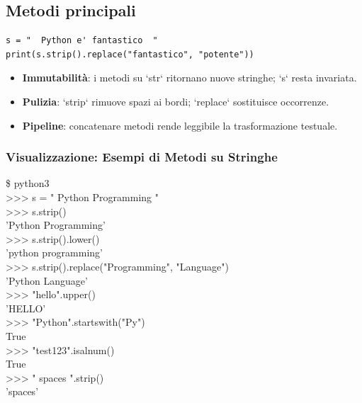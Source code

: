 \subsection{Metodi principali}
\begin{lstlisting}
s = "  Python e' fantastico  "
print(s.strip().replace("fantastico", "potente"))
\end{lstlisting}
\begin{tcolorbox}[title=Spiegazione del codice]
\begin{itemize}
  \item \textbf{Immutabilità}: i metodi su `str` ritornano nuove stringhe; `s` resta invariata.
  \item \textbf{Pulizia}: `strip` rimuove spazi ai bordi; `replace` sostituisce occorrenze.
  \item \textbf{Pipeline}: concatenare metodi rende leggibile la trasformazione testuale.
\end{itemize}
\end{tcolorbox}

\subsubsection{Visualizzazione: Esempi di Metodi su Stringhe}
\begin{center}
\begin{tcolorbox}[title={Esempi Terminal: Metodi delle Stringhe}, colback=black!5, colframe=blue!60, width=0.95\textwidth, fontupper=\ttfamily\small]
\textcolor{green!60!black}{\$ python3}\\
\textcolor{blue!80}{>>> s = "  Python Programming  "}\\
\textcolor{blue!80}{>>> s.strip()}\\
'Python Programming'\\[4pt]
\textcolor{blue!80}{>>> s.strip().lower()}\\
'python programming'\\[4pt]
\textcolor{blue!80}{>>> s.strip().replace("Programming", "Language")}\\
'Python Language'\\[4pt]
\textcolor{blue!80}{>>> "hello".upper()}\\
'HELLO'\\[4pt]
\textcolor{blue!80}{>>> "Python".startswith("Py")}\\
True\\[4pt]
\textcolor{blue!80}{>>> "test123".isalnum()}\\
True\\[4pt]
\textcolor{blue!80}{>>> "  spaces  ".strip()}\\
'spaces'
\end{tcolorbox}
\end{center}

